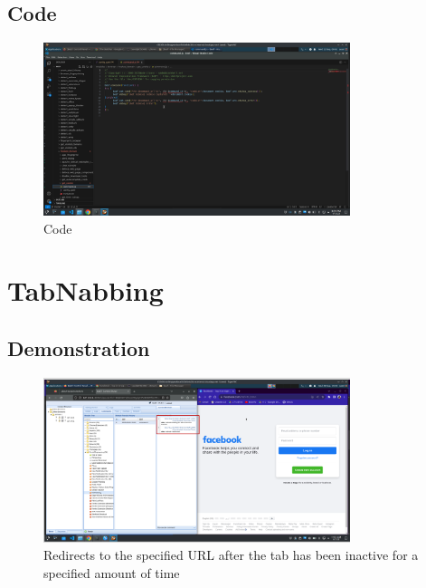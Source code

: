\documentclass{report}
\begin{document}
\pagebreak

\subsection{Code}
\begin{figure}[!htbp]
    \centering
    \includegraphics[width=0.8\textwidth]{Get Cookie/code.png}
    \caption{Code}
    \label{fig:gc3}
\end{figure}

\pagebreak


\section{TabNabbing}
\subsection{Demonstration}

\begin{figure}[!htbp]
    \centering
    \includegraphics[width=0.8\textwidth]{TabNabbing/1.png}
    \caption{Redirects to the specified URL after the tab has been inactive for a specified amount of time}
    \label{fig:tn1}
\end{figure}
\end{document}
